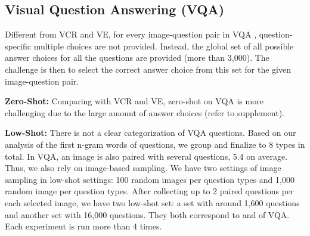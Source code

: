 \documentclass[runningheads]{llncs}
\begin{document}
\subsection{Visual Question Answering (VQA)}

Different from VCR and VE, for every image-question pair in VQA \cite{VQA},  question-specific multiple choices are not provided. Instead, the global set of all possible answer choices for all the questions are provided (more than 3,000). The challenge is then to select the correct answer choice from this set for the given image-question pair.




{\bf \noindent Zero-Shot: }Comparing with VCR and VE, zero-shot on VQA is more challenging due to the large amount of answer choices (refer to supplement).

{\bf \noindent Low-Shot:}
There is not a clear categorization of VQA questions. Based on our analysis of the first n-gram words of questions, we group and finalize to 8 types in total. In VQA, an image is also paired with several questions, 5.4 on average. Thus, we also rely on image-based sampling. We have two settings of image sampling in low-shot settings: 100 random images per question types and 1,000 random image per question types. After collecting up to 2 paired questions per each selected image, we have two low-shot set: a set with around 1,600 questions and another set with 16,000 questions. They both correspond to  and  of VQA. Each experiment is run more than 4 times.
\end{document}
